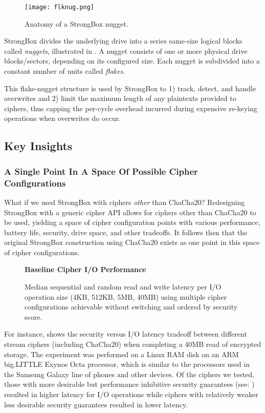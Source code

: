 \begin{figure}[ht]
   \centering
   \texttt{[image: flknug.png]}
   \caption{Anatomy of a StrongBox nugget.}\label{fig:flknug}
\end{figure}

StrongBox divides the underlying drive into a series same-size logical blocks
called \emph{nuggets}, illustrated in . A nugget consists of one
or more physical drive blocks/sectors, depending on its configured size. Each
nugget is subdivided into a constant number of units called \emph{flakes}.

This flake-nugget structure is used by StrongBox to 1) track, detect, and handle
overwrites and 2) limit the maximum length of any plaintexts provided to
ciphers, thus capping the per-cycle overhead incurred during expensive re-keying
operations when overwrites do occur.

\subsection{Key Insights}

\subsubsection{A Single Point In A Space Of Possible Cipher Configurations}

What if we used StrongBox with ciphers \textit{other} than ChaCha20? Redesigning
StrongBox with a generic cipher API allows for ciphers other than ChaCha20 to be
used, yielding a space of cipher configuration points with various performance,
battery life, security, drive space, and other tradeoffs. It follows then that
the original StrongBox construction using ChaCha20 exists as one point in this
space of cipher configurations.

\begin{figure}[ht] \textbf{Baseline Cipher I/O Performance}\par\medskip
   \centering
   {} \caption{Median sequential and random
   read and write latency per I/O operation size (4KB, 512KB, 5MB, 40MB) using
   multiple cipher configurations achievable without switching and ordered by
   security score.}
  \label{fig:tradeoff-no-ratios}
\end{figure}

For instance,  shows the security versus I/O latency
tradeoff between different stream ciphers (including ChaCha20) when completing a
40MB read of encrypted storage. The experiment was performed on a Linux RAM disk
on an ARM big.LITTLE Exynos Octa processor, which is similar to the processors
used in the Samsung Galaxy line of phones and other devices. Of the ciphers we
tested, those with more desirable but performance inhibitive security guarantees
(see: ) resulted in higher latency for I/O operations while
ciphers with relatively weaker less desirable security guarantees resulted in
lower latency.

